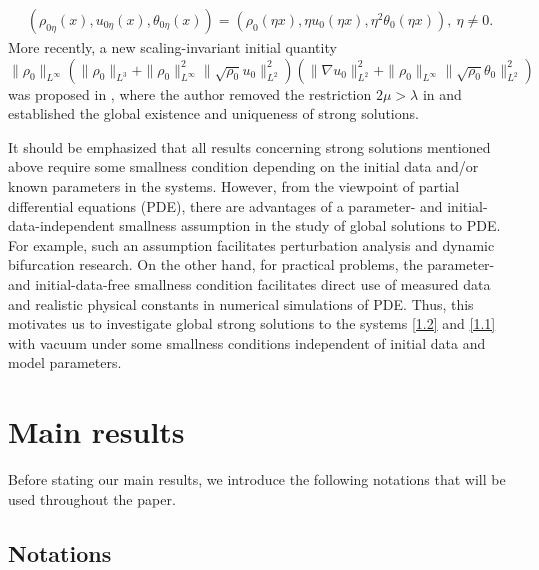 \documentclass[11pt]{article}
\begin{document}
\begin{align*}
(\rho_{0\eta}(x),u_{0\eta}(x),\theta_{0\eta}(x))
=(\rho_{0}(\eta x),\eta u_{0}(\eta x),\eta^2\theta_{0}(\eta x)),\ \eta\neq0.
\end{align*}
More recently, a new scaling-invariant initial quantity
\begin{equation}\label{1.4}
\|\rho_0\|_{L^\infty}
\left(\|\rho_0\|_{L^3}+\|\rho_0\|_{L^\infty}^2\|\sqrt{\rho_0} u_0\|_{L^2}^2\right)
\left(\|\nabla u_0\|_{L^2}^2 +\|\rho_0\|_{L^\infty}\|\sqrt{\rho_0} \theta_0\|_{L^2}^2\right)
\end{equation}
was proposed in \cite{W2025}, where the author removed the restriction $2\mu>\lambda$ in \cite{Li2020} and established the global existence and uniqueness of strong solutions.

It should be emphasized that all results concerning strong solutions mentioned above require some smallness condition depending on the initial data and/or known parameters in the systems. However, from the viewpoint of partial differential equations (PDE), there are advantages of a parameter- and initial-data-independent smallness assumption in the study of global solutions to PDE. For example, such an assumption facilitates perturbation analysis and dynamic bifurcation research. On the other hand, for practical problems, the parameter- and initial-data-free smallness condition facilitates direct use of measured data and realistic physical constants in numerical simulations of PDE. Thus, this motivates us to investigate global strong solutions to the systems \eqref{1.2} and \eqref{1.1} with vacuum under some smallness conditions independent of initial data and model parameters.

\section{Main results}

Before stating our main results, we introduce the following notations that will be used throughout the paper.
\subsection{Notations}
\end{document}
